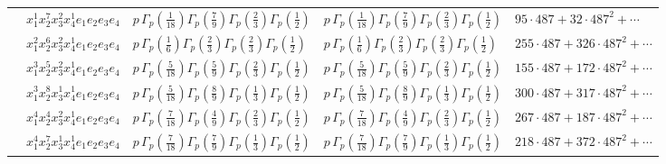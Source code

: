 \documentclass[11pt]{article}
\begin{document}
\begin{table}[ht]
{\begin{tabular}{@{}lllll@{}}
 & $x_{1}^{1} x_{2}^{7} x_{3}^{2} x_{4}^{1}  e_{1} e_{2} e_{3} e_{4}$ & $p \, \Gamma_p \left( \frac{1}{18} \right) \Gamma_p \left( \frac{7}{9} \right) \Gamma_p \left( \frac{2}{3} \right) \Gamma_p \left( \frac{1}{2} \right)$ & $p \, \Gamma_p \left( \frac{1}{18} \right) \Gamma_p \left( \frac{7}{9} \right) \Gamma_p \left( \frac{2}{3} \right) \Gamma_p \left( \frac{1}{2} \right)$ & $95{\cdot}487{+}32{\cdot}487^{2}{+}\cdots$ \\
 & $x_{1}^{2} x_{2}^{6} x_{3}^{2} x_{4}^{1}  e_{1} e_{2} e_{3} e_{4}$ & $p \, \Gamma_p \left( \frac{1}{6} \right) \Gamma_p \left( \frac{2}{3} \right) \Gamma_p \left( \frac{2}{3} \right) \Gamma_p \left( \frac{1}{2} \right)$ & $p \, \Gamma_p \left( \frac{1}{6} \right) \Gamma_p \left( \frac{2}{3} \right) \Gamma_p \left( \frac{2}{3} \right) \Gamma_p \left( \frac{1}{2} \right)$ & $255{\cdot}487{+}326{\cdot}487^{2}{+}\cdots$ \\
 & $x_{1}^{3} x_{2}^{5} x_{3}^{2} x_{4}^{1}  e_{1} e_{2} e_{3} e_{4}$ & $p \, \Gamma_p \left( \frac{5}{18} \right) \Gamma_p \left( \frac{5}{9} \right) \Gamma_p \left( \frac{2}{3} \right) \Gamma_p \left( \frac{1}{2} \right)$ & $p \, \Gamma_p \left( \frac{5}{18} \right) \Gamma_p \left( \frac{5}{9} \right) \Gamma_p \left( \frac{2}{3} \right) \Gamma_p \left( \frac{1}{2} \right)$ & $155{\cdot}487{+}172{\cdot}487^{2}{+}\cdots$ \\
 & $x_{1}^{3} x_{2}^{8} x_{3}^{1} x_{4}^{1}  e_{1} e_{2} e_{3} e_{4}$ & $p \, \Gamma_p \left( \frac{5}{18} \right) \Gamma_p \left( \frac{8}{9} \right) \Gamma_p \left( \frac{1}{3} \right) \Gamma_p \left( \frac{1}{2} \right)$ & $p \, \Gamma_p \left( \frac{5}{18} \right) \Gamma_p \left( \frac{8}{9} \right) \Gamma_p \left( \frac{1}{3} \right) \Gamma_p \left( \frac{1}{2} \right)$ & $300{\cdot}487{+}317{\cdot}487^{2}{+}\cdots$ \\
 & $x_{1}^{4} x_{2}^{4} x_{3}^{2} x_{4}^{1}  e_{1} e_{2} e_{3} e_{4}$ & $p \, \Gamma_p \left( \frac{7}{18} \right) \Gamma_p \left( \frac{4}{9} \right) \Gamma_p \left( \frac{2}{3} \right) \Gamma_p \left( \frac{1}{2} \right)$ & $p \, \Gamma_p \left( \frac{7}{18} \right) \Gamma_p \left( \frac{4}{9} \right) \Gamma_p \left( \frac{2}{3} \right) \Gamma_p \left( \frac{1}{2} \right)$ & $267{\cdot}487{+}187{\cdot}487^{2}{+}\cdots$ \\
 & $x_{1}^{4} x_{2}^{7} x_{3}^{1} x_{4}^{1}  e_{1} e_{2} e_{3} e_{4}$ & $p \, \Gamma_p \left( \frac{7}{18} \right) \Gamma_p \left( \frac{7}{9} \right) \Gamma_p \left( \frac{1}{3} \right) \Gamma_p \left( \frac{1}{2} \right)$ & $p \, \Gamma_p \left( \frac{7}{18} \right) \Gamma_p \left( \frac{7}{9} \right) \Gamma_p \left( \frac{1}{3} \right) \Gamma_p \left( \frac{1}{2} \right)$ & $218{\cdot}487{+}372{\cdot}487^{2}{+}\cdots$ \\

\end{tabular}}
\end{table}
\end{document}
